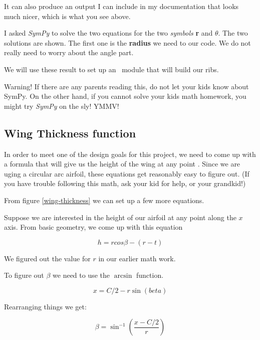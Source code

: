 It can also produce an output I can include in my documentation that looks much
nicer, which is what you see above.

I asked {\it SymPy} to solve the two equations for the two {\it symbols} {\bf
r} and {$ \theta $}. The two solutions are shown. The first one is the {\bf
radius} we need to our code.  We do not really need to worry about the angle
part.

We will use these result to set up an \osc\ module that will build our ribs.

Warning! If there are any parents reading this, do not let your kids know about
SymPy.  On the other hand, if you cannot solve your kids math homework, you
might try {\it SymPy} on the sly! YMMV!

\subsection{Wing Thickness function}

In order to meet one of the design goals for this project, we need to come up
with a formula that will give us the height of the wing at any point . Since we
are uging a circular arc airfoil, these equations get reasonably easy to figure
out. (If you have trouble following this math, ask your kid for help, or your
grandkid!)


From figure \ref{wing-thickness} we can set up a few more equations.


Suppose we are interested in the height of our airfoil at any point along the
{$x$} axis. From basic geometry, we come up with this equation

\begin{equation}
  h = r cos{\beta} - ( r - t )
\end{equation}

We figured out the value for {$r$} in our earlier math work.


To figure out {$\beta$} we need to use the $\arcsin$ function.

\begin{equation}
  x = C / 2 - r \sin(beta)
\end{equation}

Rearranging things we get:

\begin{equation}
  \beta = \sin^{-1} ( \frac{x - C/2}{r} )
\end{equation}

